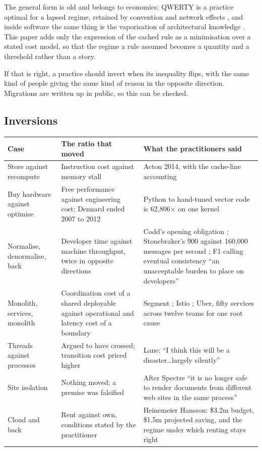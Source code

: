 \documentclass[11pt,oneside]{article}
\theoremstyle{definition}
\theoremstyle{remark}
\begin{document}
The general form is old and belongs to economics: QWERTY is a practice optimal for a lapsed regime,
retained by convention and network effects \cite{david1985,arthur1989}, and inside software
the same thing is the vaporisation of architectural knowledge \cite{jansenbosch2005}. This
paper adds only the expression of the cached rule as a minimisation over a stated
cost model, so that the regime a rule assumed becomes a quantity and a threshold rather than a story.

If that is right, a practice should invert when its inequality flips, with
the same kind of people giving the same kind of reason in the opposite direction.
Migrations are written up in public, so this can be checked.

\subsection{Inversions}\label{sec:inversions}

\begin{center}
\small
\begin{longtable}{@{}p{}p{}p{}@{}}
\toprule
\textbf{Case} & \textbf{The ratio that moved} & \textbf{What the practitioners said} \\
\midrule
\endhead
Store against recompute & Instruction cost against memory stall & Acton 2014, with the
cache-line accounting \cite{acton2014} \\
\addlinespace
Buy hardware against optimise & Free performance against engineering cost; Dennard ended
2007 to 2012 & Python to hand-tuned vector code is 62,806$\times$ on one kernel
\cite{leiserson2020} \\
\addlinespace
Normalise, denormalise, back & Developer time against machine throughput, twice in opposite
directions & Codd's opening obligation \cite{codd1970}; Stonebraker's 900 against 160,000
messages per second \cite{stonebraker2005}; F1 calling eventual consistency ``an
unacceptable burden to place on developers'' \cite{shute2013} \\
\addlinespace
Monolith, services, monolith & Coordination cost of a shared deployable against operational
and latency cost of a boundary & Segment \cite{noonan2018}; Istio \cite{mendonca2021}; Uber,
fifty services across twelve teams for one root cause \cite{gluck2020} \\
\addlinespace
Threads against processes & Argued to have crossed; transition cost priced higher & Lane:
``I think this will be a disaster\dots largely silently'' \cite{lane2023} \\
\addlinespace
Site isolation & Nothing moved; a premise was falsified & After Spectre ``it is no longer
safe to render documents from different web sites in the same process'' \cite{reis2019} \\
\addlinespace
Cloud and back & Rent against own, conditions stated by the practitioner & Heinemeier
Hansson: \$3.2m budget, \$1.5m projected saving, and the regime under which renting stays
right \cite{dhh2023} \\
\bottomrule
\end{longtable}
\end{center}
\end{document}
